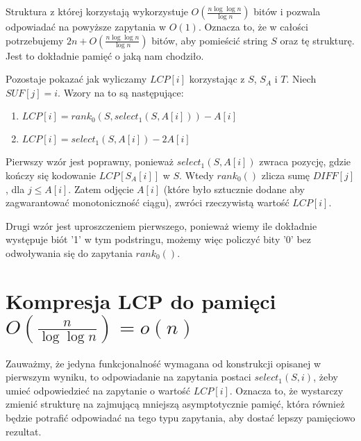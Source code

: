 \documentclass{article}
\begin{document}
Struktura z której korzystają wykorzystuje $O(\frac{n \log{\log{n}}}{\log{n}})$ bitów i pozwala odpowiadać na powyższe zapytania w $O(1)$. Oznacza to, że w całości potrzebujemy $2n + O(\frac{n \log{\log{n}}}{\log{n}})$ bitów, aby pomieścić string $S$ oraz tę strukturę. Jest to dokładnie pamięć o jaką nam chodziło.

Pozostaje pokazać jak wyliczamy $LCP[i]$ korzystając z $S$, $S_A$ i $T$. Niech $SUF[j] = i$. Wzory na to są następujące:


\begin{enumerate}
    \item $LCP[i] = rank_0(S, select_1(S, A[i])) - A[i]$
    \item $LCP[i] = select_1(S, A[i]) - 2A[i]$
\end{enumerate}


Pierwszy wzór jest poprawny, ponieważ $select_1(S, A[i])$ zwraca pozycję, gdzie kończy się kodowanie $LCP[S_A[i]]$ w $S$. Wtedy $rank_0()$ zlicza sumę $DIFF[j]$, dla $j \le A[i]$. Zatem odjęcie $A[i]$ (które było sztucznie dodane aby zagwarantować monotoniczność ciągu), zwróci rzeczywistą wartość $LCP[i]$.

Drugi wzór jest uproszczeniem pierwszego, ponieważ wiemy ile dokładnie występuje biót '1' w tym podstringu, możemy więc policzyć bity '0' bez odwoływania się do zapytania $rank_0()$.

\section{Kompresja LCP do pamięci $O(\frac{n}{\log{\log{n}}}) = o(n)$}

Zauważmy, że jedyna funkcjonalność wymagana od konstrukcji opisanej w pierwszym wyniku, to odpowiadanie na zapytania postaci $select_1(S, i)$, żeby umieć odpowiedzieć na zapytanie o wartość $LCP[i]$. Oznacza to, że wystarczy zmienić strukturę na zajmującą mniejszą asymptotycznie pamięć, która również będzie potrafić odpowiadać na tego typu zapytania, aby dostać lepszy pamięciowo rezultat.
\end{document}
